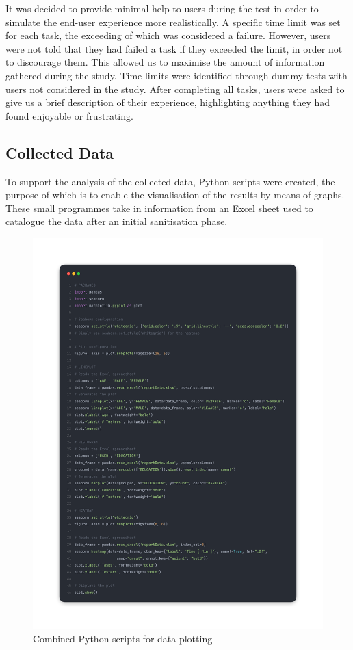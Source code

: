 It was decided to provide minimal help to users during the test in order to simulate the end-user experience more realistically.
A specific time limit was set for each task, the exceeding of which was considered a failure. 
However, users were not told that they had failed a task if they exceeded the limit, in order not to discourage them. 
This allowed us to maximise the amount of information gathered during the study.
Time limits were identified through dummy tests with users not considered in the study. 
After completing all tasks, users were asked to give us a brief description of their experience, highlighting anything they had found enjoyable or frustrating. 

\newpage
\subsection{Collected Data}

To support the analysis of the collected data, Python scripts were created, the purpose of which is to enable the visualisation of the results by means of graphs. 
These small programmes take in information from an Excel sheet used to catalogue the data after an initial sanitisation phase. 

\begin{figure}[htp!]
    \centering
    \includegraphics[scale=0.115]{Resources/Shared/pythonCode.png}
    \caption{Combined Python scripts for data plotting}
\end{figure}

